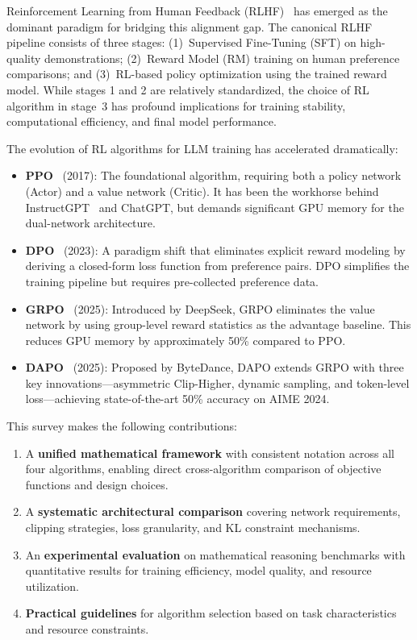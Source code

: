 Reinforcement Learning from Human Feedback (RLHF)~\cite{christo2017deep, ouyang2022instructgpt} has emerged as the dominant paradigm for bridging this alignment gap. The canonical RLHF pipeline consists of three stages: (1)~Supervised Fine-Tuning (SFT) on high-quality demonstrations; (2)~Reward Model (RM) training on human preference comparisons; and (3)~RL-based policy optimization using the trained reward model. While stages 1 and 2 are relatively standardized, the choice of RL algorithm in stage~3 has profound implications for training stability, computational efficiency, and final model performance.

The evolution of RL algorithms for LLM training has accelerated dramatically:

\begin{itemize}[leftmargin=*, itemsep=2pt]
\item \textbf{PPO}~\cite{schulman2017ppo} (2017): The foundational algorithm, requiring both a policy network (Actor) and a value network (Critic). It has been the workhorse behind InstructGPT~\cite{ouyang2022instructgpt} and ChatGPT, but demands significant GPU memory for the dual-network architecture.
\item \textbf{DPO}~\cite{rafailov2023dpo} (2023): A paradigm shift that eliminates explicit reward modeling by deriving a closed-form loss function from preference pairs. DPO simplifies the training pipeline but requires pre-collected preference data.
\item \textbf{GRPO}~\cite{deepseek2025r1, shao2024deepseekmath} (2025): Introduced by DeepSeek, GRPO eliminates the value network by using group-level reward statistics as the advantage baseline. This reduces GPU memory by approximately 50\% compared to PPO.
\item \textbf{DAPO}~\cite{yu2025dapo} (2025): Proposed by ByteDance, DAPO extends GRPO with three key innovations---asymmetric Clip-Higher, dynamic sampling, and token-level loss---achieving state-of-the-art 50\% accuracy on AIME 2024.
\end{itemize}

This survey makes the following contributions:
\begin{enumerate}[leftmargin=*, itemsep=1pt]
\item A \textbf{unified mathematical framework} with consistent notation across all four algorithms, enabling direct cross-algorithm comparison of objective functions and design choices.
\item A \textbf{systematic architectural comparison} covering network requirements, clipping strategies, loss granularity, and KL constraint mechanisms.
\item An \textbf{experimental evaluation} on mathematical reasoning benchmarks with quantitative results for training efficiency, model quality, and resource utilization.
\item \textbf{Practical guidelines} for algorithm selection based on task characteristics and resource constraints.
\end{enumerate}

